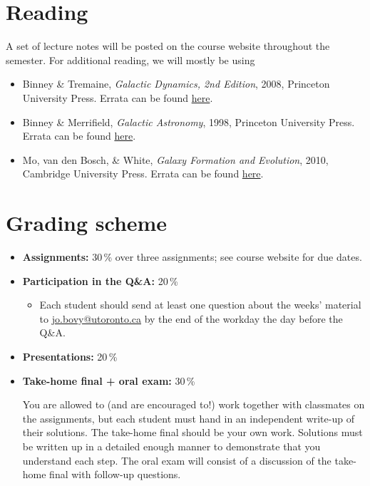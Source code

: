 \documentclass{article}
\begin{document}
\section*{Reading}

A set of lecture notes will be posted on the course website throughout
 the semester. For additional reading, we will mostly be using

\begin{itemize}

  \item Binney \& Tremaine, \emph{Galactic Dynamics, 2nd Edition},
    2008, Princeton University Press. Errata can be found
    \href{https://www-thphys.physics.ox.ac.uk/people/JamesBinney/web/index\_files/BT2errors.pdf}{here}.

  \item Binney \& Merrifield, \emph{Galactic Astronomy},
    1998, Princeton University Press. Errata can be found
    \href{http://www-thphys.physics.ox.ac.uk/people/JamesBinney/bmerrors.pdf}{here}.

  \item Mo, van den Bosch, \& White, \emph{Galaxy Formation and Evolution},
    2010, Cambridge University Press. Errata can be found
    \href{http://people.umass.edu/hjmo/book/errata.pdf}{here}.

\end{itemize}

\section*{Grading scheme}

\begin{itemize}

  \item {\bf Assignments:} 30\,\% over three assignments; see course website for due dates.

  \item {\bf Participation in the Q\&A:} 20\,\%
    \begin{itemize}
      \item Each student should send at least one question about the
        weeks' material to
        \href{mailto:jo.bovy@utoronto.ca}{jo.bovy@utoronto.ca} by the
        end of the workday the day before the Q\&A.
    \end{itemize}

  \item {\bf Presentations:} 20\,\%

  \item {\bf Take-home final + oral exam:} 30\,\%

You are allowed to (and are encouraged to!) work together with
classmates on the assignments, but each student must hand in an
independent write-up of their solutions. The take-home final should be
your own work. Solutions must be written up in a detailed enough
manner to demonstrate that you understand each step. The oral exam
will consist of a discussion of the take-home final with follow-up
questions.

\end{itemize}
\end{document}

